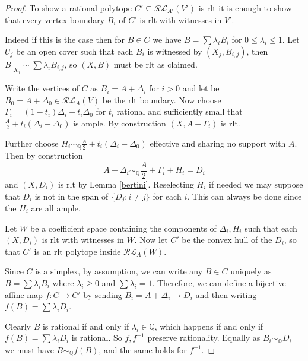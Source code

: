 \documentclass[a4paper,12pt]{amsart}
\begin{document}
	\begin{proof}
		To show a rational polytope $C'\subseteq \mathcal{RL}_{A'}(V')$ is rlt it is enough to show that every vertex boundary $B_{i}$ of $C'$ is rlt with witnesses in $V'$.
				
		Indeed if this is the case then for $B \in C$ we have $B= \sum \lambda_{i} B_{i}$ for $0 \leq \lambda_{i} \leq 1$. Let $U_{j}$ be an open cover such that each $B_{i}$ is witnessed by $(X_{j},B_{i,j})$, then $B|_{X_{j}}\sim \sum \lambda_{i}B_{i,j}$, so $(X,B)$ must be rlt as claimed.
		
		
		
		Write the vertices of $C$ as $B_{i}=A+\Delta_{i}$ for $i > 0$ and let be $B_{0}=A+\Delta_{0} \in \mathcal{RL}_{A}(V)$ be the rlt boundary. Now choose $\Gamma_{i} =(1-t_{i})\Delta_{i}+t_{i}\Delta_{0}$ for $t_{i}$ rational and sufficiently small that $\frac{A}{2}+t_{i}(\Delta_{i}-\Delta_{0})$ is ample. By construction $(X,A+\Gamma_{i})$ is rlt.
		
		Further choose $H_{i} \sim_{\mathbb{Q}} \frac{A}{2}+t_{i}(\Delta_{i}-\Delta_{0})$ effective and sharing no support with $A$. Then by construction
		\[A+\Delta_{i} \sim_{\mathbb{Q}} \frac{A}{2}+\Gamma_{i}+H_{i}=D_{i}\]
		and $(X,D_{i})$ is rlt by Lemma \ref{bertini}. Reselecting $H_{i}$ if needed we may suppose that $D_{i}$ is not in the span of $\{D_{j}: i \neq j\}$ for each $i$. This can always be done since the $H_{i}$ are all ample.
		
		Let $W$ be a coefficient space containing the components of $\Delta_{i}, H_{i}$ such that each $(X,D_{i})$ is rlt with witnesses in $W$. Now let $C'$ be the convex hull of the $D_{i}$, so that $C'$ is an rlt polytope inside $\mathcal{RL}_{A}(W)$.
		
		Since $C$ is a simplex, by assumption, we can write any $B \in C$ uniquely as $B=\sum \lambda_{i} B_{i}$ where $\lambda_{i} \geq 0$ and $\sum \lambda_{i} =1$. Therefore, we can define a bijective affine map $f: C \to C'$ by sending $B_{i}=A+\Delta_{i} \to D_{i}$ and then writing $f(B)= \sum \lambda_{i} D_{i}$.
		
		Clearly $B$ is rational if and only if $\lambda_{i} \in \mathbb{Q}$, which happens if and only if $f(B)=\sum \lambda_{i} D_{i}$ is rational. So $f, f^{-1}$ preserve rationality. Equally as $B_{i} \sim_{\mathbb{Q}} D_{i}$ we must have $B \sim_{\mathbb{Q}} f(B)$, and the same holds for $f^{-1}$.
			
	\end{proof}
\end{document}
